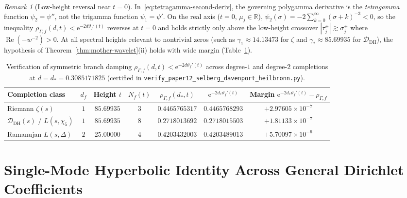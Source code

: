 \documentclass[11pt,reqno]{amsart}
\theoremstyle{definition}
\theoremstyle{remark}
\newtheorem{remark}[theorem]{Remark}
\numberwithin{equation}{section}
\newcommand{\R}{\mathbb{R}}
\newcommand{\ee}{\mathrm{e}}
\DeclareMathOperator{\Reop}{Re}
\begin{document}
\begin{remark}[Low-height reversal near $t=0$]
\label{rem:low-height}
In~\eqref{eq:tetragamma-second-deriv}, the governing polygamma derivative is the \emph{tetragamma} function $\psi_2 = \psi''$, not the trigamma function $\psi_1 = \psi'$. On the real axis ($t=0$, $\mu_j\in\R$), $\psi_2(\sigma) = -2\sum_{k=0}^{\infty}(\sigma+k)^{-3} < 0$, so the inequality $\rho_{\Gamma,f}(d,t) < \ee^{-2d\vartheta_f'(t)}$ reverses at $t=0$ and holds strictly only above the low-height crossover $|\tau_j^{\pm}| \gtrsim \sigma_j^{\pm}$ where $\Reop(-w^{-2}) > 0$. At all spectral heights relevant to nontrivial zeros (such as $\gamma_1 \approx 14.13473$ for $\zeta$ and $\gamma_* \approx 85.69935$ for $\mathcal{D}_{\mathrm{DH}}$), the hypothesis of Theorem~\ref{thm:mother-wavelet}(ii) holds with wide margin (Table~\ref{tab:branch-damping}).
\end{remark}

\begin{table}[htbp]
\centering
\caption{Verification of symmetric branch damping $\rho_{\Gamma,f}(d,t) < \ee^{-2d\vartheta_f'(t)}$ across degree-$1$ and degree-$2$ completions at $d = d_* = 0.3085171825$ (certified in \nolinkurl{verify_paper12_selberg_davenport_heilbronn.py}).}
\label{tab:branch-damping}
{\footnotesize\setlength{\tabcolsep}{4pt}%
\begin{tabular}{@{}lcccccc@{}}
\toprule
Completion class & $d_f$ & Height $t$ & $N_f(t)$ & $\rho_{\Gamma,f}(d_*,t)$ & $\ee^{-2d_*\vartheta_f'(t)}$ & Margin $\ee^{-2d_*\vartheta_f'(t)} - \rho_{\Gamma,f}$ \\
\midrule
Riemann $\zeta(s)$ & $1$ & $85.69935$ & $3$ & $0.4465765317$ & $0.4465768293$ & $+2.97605 \times 10^{-7}$ \\
$\mathcal{D}_{\mathrm{DH}}(s)$ / $L(s,\chi_5)$ & $1$ & $85.69935$ & $8$ & $0.2718013692$ & $0.2718015503$ & $+1.81133 \times 10^{-7}$ \\
Ramanujan $L(s,\Delta)$ & $2$ & $25.00000$ & $4$ & $0.4203432003$ & $0.4203489013$ & $+5.70097 \times 10^{-6}$ \\
\bottomrule
\end{tabular}%
}
\end{table}

\section{Single-Mode Hyperbolic Identity Across General Dirichlet Coefficients}
\label{sec:ellipse}
\end{document}
